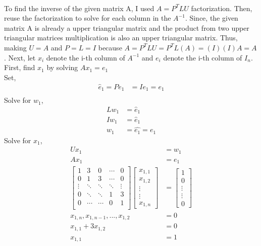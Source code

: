 \documentclass[a4paper]{article}
\begin{document}
\paragraph{}
To find the inverse of the given matrix A, I used $A = P^{T}LU$ factorization. Then, reuse the factorization to solve for each column in the $A^{-1}$. Since, the given matrix A is already a upper triangular matrix and the product from two upper triangular matrices multiplication is also an upper triangular matrix. Thus, making $U = A$ and $P = L = I$ because $A=P^TLU=P^TL(A)=(I)(I)A=A$. Next, let $x_i$ denote the i-th column of $A^{-1}$ and $e_i$ denote the i-th column of $I_n$.
First, find $x_1$ by solving $Ax_1 = e_1$\\
Set,
\begin{equation*}
\begin{split}
\hat{e}_1 = Pe_1 &= Ie_1 = e_1 \\
\end{split}
\end{equation*}
Solve for $w_1$,
\begin{equation*}
\begin{split}
Lw_1 &= \hat{e}_1 \\
Iw_1 &= \hat{e}_1 \\
w_1 &= \hat{e_1} = e_1
\end{split}
\end{equation*}
Solve for $x_1$,
\begin{equation*}
\begin{split}
Ux_1 &= w_1 \\
Ax_1 &= e_1 \\
\begin{bmatrix}
   1 & 3 & 0 & \cdots & 0 \\
   0 & 1 & 3 & \cdots & 0 \\ 
   \vdots & \ddots & \ddots & \ddots & \vdots\\
   0 & \ddots &\ddots & 1 & 3 \\
   0 & \cdots &\cdots & 0 & 1\\
\end{bmatrix}
\begin{bmatrix}
   x_{1,1} \\ x_{1,2} \\ \vdots\\ \vdots\\ x_{1,n}
\end{bmatrix}
&= \begin{bmatrix}
   1 \\ 0 \\ \vdots\\ \vdots\\ 0
\end{bmatrix}\\
x_{1,n}, x_{1,n-1}, ... ,x_{1,2}&=0\\
x_{1,1} + 3x_{1,2} &=0\\
x_{1,1} &= 1\\
\end{split}
\end{equation*}
\end{document}
